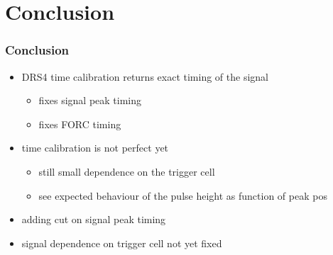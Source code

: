 \documentclass[9pt]{beamer}
\begin{document}
\section{Conclusion}
\begin{frame}
	\frametitle{Conclusion}
	\begin{minipage}[c][0.6\textheight]{\textwidth}
		\begin{itemize}
			\setlength{\itemsep}{\fill}
			\item DRS4 time calibration returns exact timing of the signal
			\begin{itemize}
				\item fixes signal peak timing
				\item fixes FORC timing
			\end{itemize}
			\item time calibration is not perfect yet
			\begin{itemize}
				\item still small dependence on the trigger cell
			\item see expected behaviour of the pulse height as function of peak pos
			\end{itemize}
			\item adding cut on signal peak timing
			\item signal dependence on trigger cell not yet fixed
		\end{itemize}
	\end{minipage}
\end{frame}
\end{document}
